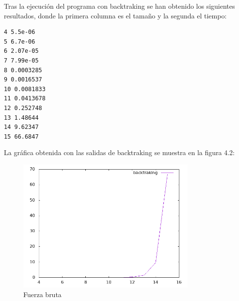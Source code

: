 	Tras la ejecución del programa con backtraking se han obtenido los siguientes resultados, donde la primera columna es el tamaño y la segunda el tiempo: \\
	
	\lstset{language=C}
	\begin{lstlisting}[frame=single]
4 5.5e-06
5 6.7e-06
6 2.07e-05
7 7.99e-05
8 0.0003285
9 0.0016537
10 0.0081833
11 0.0413678
12 0.252748
13 1.48644
14 9.62347
15 66.6847
	\end{lstlisting} 

	La gráfica obtenida con las salidas de backtraking se muestra en la figura 4.2: \\

\begin{figure}[htb]
	\centering
	\includegraphics[width=0.8\textwidth]{./imagenes/backtraking}
	\caption{Fuerza bruta} \label{fig:1}
\end{figure}
	



	


